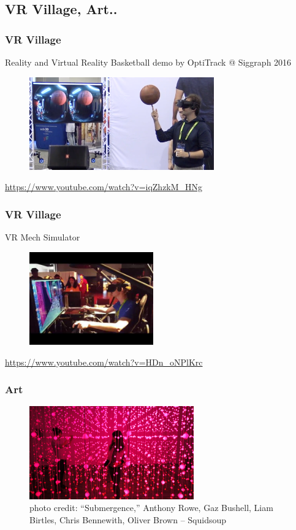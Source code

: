 \subsection{VR Village, Art..}
\frame
{
    \frametitle{VR Village}
  
Reality and Virtual Reality Basketball demo by OptiTrack @ Siggraph 2016
  		  \begin{figure}
  		  	\centering
  		  	\includegraphics[height=4cm]{img/basket.png}
  		  \end{figure}
  		  
  		  \url{https://www.youtube.com/watch?v=iqZhzkM_HNg}
}
\frame
{
	\frametitle{VR Village}
	
	VR Mech Simulator
	  \begin{figure}
	  	\centering
	  	\includegraphics[height=4cm]{img/vrmech.jpg}
	  \end{figure}
	  \url{https://www.youtube.com/watch?v=HDn_oNPlKrc}
	  
}
\frame
{
	\frametitle{Art}
	\begin{figure}
		\centering
		\includegraphics[height=4cm]{img/art.png}
		\caption{photo credit: “Submergence,” Anthony Rowe, Gaz Bushell, Liam Birtles, Chris Bennewith, Oliver Brown – Squidsoup }
	\end{figure}
}
